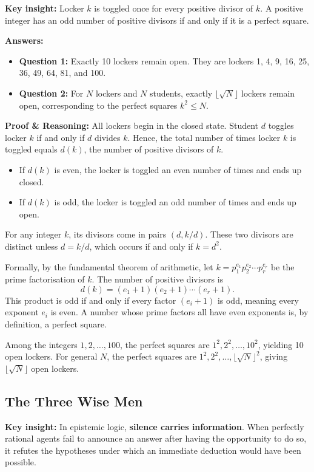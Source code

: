 \documentclass[12pt]{article}
\newcommand{\insight}[1]{\par\medskip\noindent\textbf{Key insight:} #1}
\begin{document}
\insight{Locker $k$ is toggled once for every positive divisor of $k$. A positive integer has an odd number of positive divisors if and only if it is a perfect square.}

\textbf{Answers:}
\begin{itemize}
    \item \textbf{Question 1:} Exactly 10 lockers remain open. They are lockers 1, 4, 9, 16, 25, 36, 49, 64, 81, and 100.
    \item \textbf{Question 2:} For $N$ lockers and $N$ students, exactly $\lfloor \sqrt{N} \rfloor$ lockers remain open, corresponding to the perfect squares $k^2 \le N$.
\end{itemize}

\textbf{Proof \& Reasoning:}
All lockers begin in the closed state. Student $d$ toggles locker $k$ if and only if $d$ divides $k$. Hence, the total number of times locker $k$ is toggled equals $d(k)$, the number of positive divisors of $k$.
\begin{itemize}
    \item If $d(k)$ is even, the locker is toggled an even number of times and ends up closed.
    \item If $d(k)$ is odd, the locker is toggled an odd number of times and ends up open.
\end{itemize}
For any integer $k$, its divisors come in pairs $(d, k/d)$. These two divisors are distinct unless $d = k/d$, which occurs if and only if $k = d^2$.

Formally, by the fundamental theorem of arithmetic, let $k = p_1^{e_1} p_2^{e_2} \cdots p_r^{e_r}$ be the prime factorisation of $k$. The number of positive divisors is
\[
d(k) = (e_1 + 1)(e_2 + 1)\cdots (e_r + 1).
\]
This product is odd if and only if every factor $(e_i + 1)$ is odd, meaning every exponent $e_i$ is even. A number whose prime factors all have even exponents is, by definition, a perfect square.

Among the integers $1, 2, \dots, 100$, the perfect squares are $1^2, 2^2, \dots, 10^2$, yielding 10 open lockers. For general $N$, the perfect squares are $1^2, 2^2, \dots, \lfloor\sqrt{N}\rfloor^2$, giving $\lfloor \sqrt{N} \rfloor$ open lockers.

\subsection{The Three Wise Men}

\insight{In epistemic logic, \textbf{silence carries information}. When perfectly rational agents fail to announce an answer after having the opportunity to do so, it refutes the hypotheses under which an immediate deduction would have been possible.}
\end{document}
